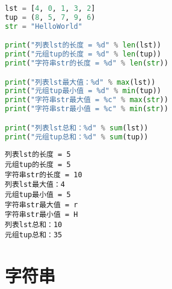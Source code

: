 \begin{table}[H]
	\centering
	\caption{序列统计函数}
\end{table}

\vspace{0.5cm}


\begin{lstlisting}[language=Python]
lst = [4, 0, 1, 3, 2]
tup = (8, 5, 7, 9, 6)
str = "HelloWorld"

print("列表lst的长度 = %d" % len(lst))
print("元组tup的长度 = %d" % len(tup))
print("字符串str的长度 = %d" % len(str))

print("列表lst最大值：%d" % max(lst))
print("元组tup最小值 = %d" % min(tup))
print("字符串str最大值 = %c" % max(str))
print("字符串str最小值 = %c" % min(str))

print("列表lst总和：%d" % sum(lst))
print("元组tup总和：%d" % sum(tup))
\end{lstlisting}

\begin{tcolorbox}
	\begin{verbatim}
列表lst的长度 = 5
元组tup的长度 = 5
字符串str的长度 = 10
列表lst最大值：4
元组tup最小值 = 5
字符串str最大值 = r
字符串str最小值 = H
列表lst总和：10
元组tup总和：35
\end{verbatim}
\end{tcolorbox}

\newpage

\section{字符串}

